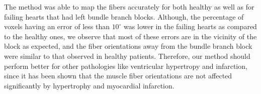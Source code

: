 

The method was able to map the fibers accurately for both healthy as well as for failing hearts that had left bundle branch blocks. Although, the percentage of voxels having an error of less than $10^\circ$ was lower in the failing hearts as compared to the healthy ones, we observe that most of these errors are in the vicinity of the block as expected, and the fiber orientations away from the bundle branch block were similar to that observed in healthy patients. Therefore, our method should perform better for other pathologies like ventricular hypertropy and infarction, since it has been shown that the muscle fiber orientations are not affected significantly by hypertrophy and myocardial infarction\cite{walker05}. 

